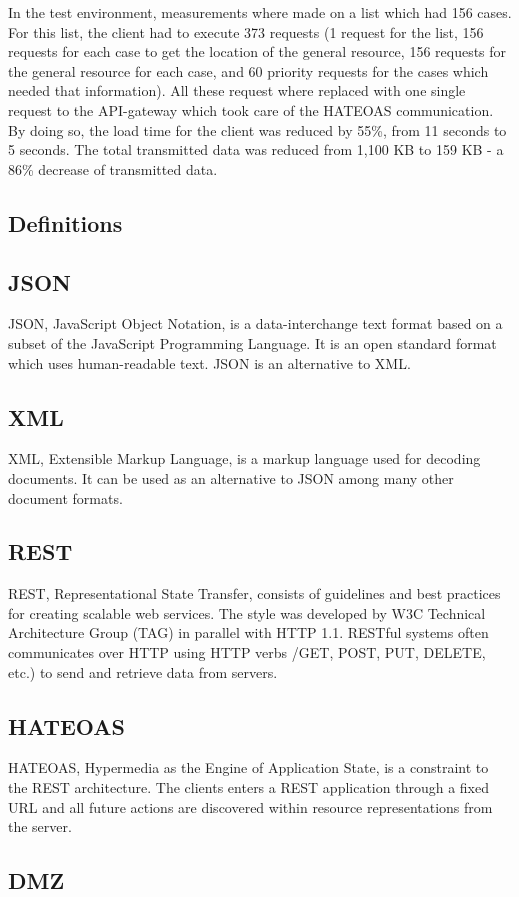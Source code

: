 \documentclass{cslthse-msc}
\begin{document}
In the test environment, measurements where made on a list which had 156 cases. For this list, the client had to execute 373 requests (1 request for the list, 156 requests for each case to get the location of the general resource, 156 requests for the general resource for each case, and 60 priority requests for the cases which needed that information). All these request where replaced with one single request to the API-gateway which took care of the HATEOAS communication. By doing so, the load time for the client was reduced by 55\%, from 11 seconds to 5 seconds. The total transmitted data was reduced from 1,100 KB to 159 KB - a 86\% decrease of transmitted data.

\cleardoublepage
{}
{}



\begin{appendices}
\chapter{Definitions}
\section{JSON}
JSON, JavaScript Object Notation, is a data-interchange text format based on a subset of the JavaScript Programming Language. It is an open standard format which uses human-readable text. JSON is an alternative to XML.

\section{XML}
XML, Extensible Markup Language, is a markup language used for decoding documents. It can be used as an alternative to JSON among many other document formats.

\section{REST}
REST, Representational State Transfer, consists of guidelines and best practices for creating scalable web services. The style was developed by W3C Technical Architecture Group (TAG) in parallel with HTTP 1.1. RESTful systems often communicates over HTTP using HTTP verbs /GET, POST, PUT, DELETE, etc.) to send and retrieve data from servers.

\section{HATEOAS}
HATEOAS, Hypermedia as the Engine of Application State, is a constraint to the REST architecture. The clients enters a REST application through a fixed URL and all future actions are discovered within resource representations from the server.

\section{DMZ}

\end{appendices}

\end{document}
